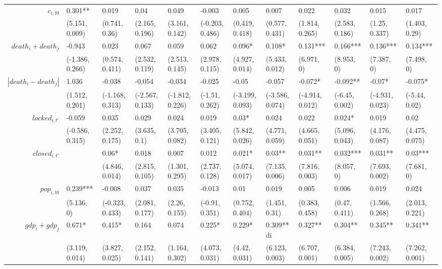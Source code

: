 {\begin{landscape}
\begin{table}[ht]
\begin{threeparttable}
\begin{tiny}
\begin{tabular}{rlllllllllll}
 $c_{i,t0}$ & 0.301** & 0.019 & 0.04 & 0.049 & -0.003 & 0.005 & 0.007 & 0.022 & 0.032 & 0.015 & 0.017 \\ 
   & (5.151, 0.009) & (0.741, 0.36) & (2.165, 0.196) & (3.161, 0.142) & (-0.203, 0.486) & (0.419, 0.418) & (0.577, 0.431) & (1.814, 0.265) & (2.583, 0.186) & (1.25, 0.337) & (1.403, 0.29) \\ 
  $death_i + death_j$ & -0.943 & 0.023 & 0.067 & 0.059 & 0.062 & 0.096* & 0.108* & 0.131*** & 0.166*** & 0.136*** & 0.134*** \\ 
   & (-1.386, 0.266) & (0.574, 0.411) & (2.532, 0.119) & (2.513, 0.145) & (2.978, 0.115) & (4.927, 0.014) & (5.433, 0.012) & (6.971, 0) & (8.953, 0) & (7.387, 0) & (7.498, 0) \\ 
  $|death_i - death_j|$ & 1.036 & -0.038 & -0.054 & -0.034 & -0.025 & -0.05 & -0.057 & -0.072* & -0.092** & -0.07* & -0.075* \\ 
   & (1.512, 0.201) & (-1.168, 0.313) & (-2.567, 0.133) & (-1.812, 0.226) & (-1.51, 0.262) & (-3.199, 0.093) & (-3.586, 0.074) & (-4.914, 0.012) & (-6.45, 0.002) & (-4.931, 0.023) & (-5.44, 0.02) \\ 
  $locked_{i,t'}$ & -0.059 & 0.035 & 0.029 & 0.024 & 0.019 & 0.03* & 0.024 & 0.022 & 0.024* & 0.019 & 0.02 \\ 
   & (-0.586, 0.315) & (2.252, 0.175) & (3.635, 0.1) & (3.705, 0.082) & (3.405, 0.121) & (5.842, 0.026) & (4.771, 0.059) & (4.665, 0.051) & (5.096, 0.043) & (4.176, 0.087) & (4.475, 0.075) \\ 
  $closed_{i,t'}$ &  & 0.06* & 0.018 & 0.007 & 0.012 & 0.021* & 0.03** & 0.031** & 0.032*** & 0.031** & 0.03*** \\ 
   &  & (4.846, 0.014) & (2.815, 0.105) & (1.301, 0.295) & (2.737, 0.128) & (5.074, 0.017) & (7.135, 0.006) & (7.816, 0.003) & (8.057, 0) & (7.693, 0.002) & (7.681, 0) \\ 
 $pop_{i,t0}$ & 0.239*** & -0.008 & 0.037 & 0.035 & -0.013 & 0.01 & 0.019 & 0.005 & 0.006 & 0.019 & 0.024 \\ 
   & (5.136, 0) & (-0.323, 0.433) & (2.081, 0.177) & (2.26, 0.155) & (-0.91, 0.351) & (0.752, 0.404) & (1.451, 0.31) & (0.383, 0.458) & (0.47, 0.411) & (1.566, 0.268) & (2.013, 0.221) \\ 
$gdp_i + gdp_j$ & 0.671* & 0.415* & 0.164 & 0.074 & 0.225* & 0.229* & 0.309** di& 0.327** & 0.304** & 0.345** & 0.341** \\ 
   & (3.119, 0.014) & (3.827, 0.025) & (2.152, 0.141) & (1.164, 0.302) & (4.073, 0.031) & (4.42, 0.031) & (6.123, 0.003) & (6.707, 0.001) & (6.384, 0.005) & (7.243, 0.002) & (7.262, 0.001) \\ 

\end{tabular}
\end{tiny}
\end{threeparttable}
\end{table}
\end{landscape}}
